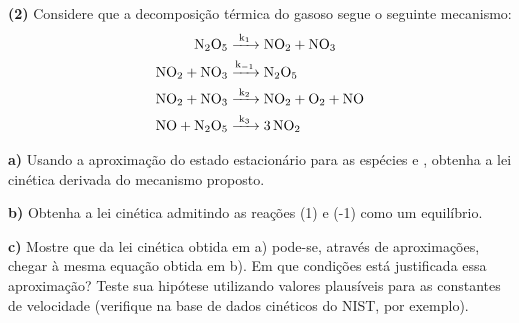 \textbf{(2)} Considere que a decomposição térmica do  gasoso segue o seguinte mecanismo:
\begin{align*}
    \ce{N2O5 &->[{k_1}] NO2 + NO3}\\
    \ce{NO2 + NO3 &->[{k_{-1}}] N2O5}\\
    \ce{NO2 + NO3 &->[{k_2}] NO2 + O2 + NO}\\
    \ce{NO + N2O5 &->[{k_3}] 3NO2}
\end{align*}

\textbf{a)} Usando a aproximação do estado estacionário para as espécies  e , obtenha a lei cinética derivada do mecanismo proposto.

\textbf{b)} Obtenha a lei cinética admitindo as reações (1) e (-1) como um equilíbrio.

\textbf{c)} Mostre que da lei cinética obtida em a) pode-se, através de aproximações, chegar à mesma equação obtida em b). Em que condições está justificada essa aproximação? Teste sua hipótese utilizando valores plausíveis para as constantes de velocidade (verifique na base de dados cinéticos do NIST, por exemplo).
